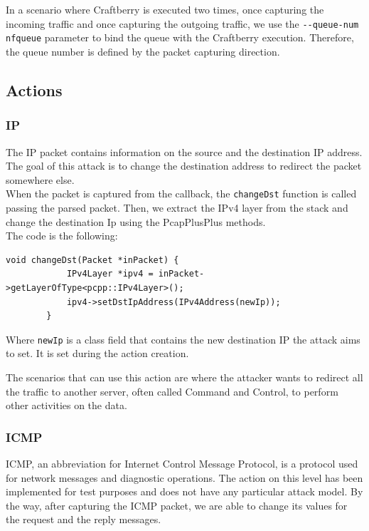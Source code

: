 \documentclass[12pt]{article}
\begin{document}
	In a scenario where Craftberry is executed two times, once capturing the incoming traffic and once capturing the outgoing traffic, we use the \lstinline{--queue-num nfqueue} parameter to bind the queue with the Craftberry execution. Therefore, the queue number is defined by the packet capturing direction.

	\subsection{Actions}

	\subsubsection{IP}
	The IP packet contains information on the source and the destination IP address. The goal of this attack is to change the destination address to redirect the packet somewhere else.\\
	When the packet is captured from the callback, the \lstinline{changeDst} function is called passing the parsed packet. Then, we extract the IPv4 layer from the stack and change the destination Ip using the PcapPlusPlus methods.\\
	The code is the following:
	\bigbreak

	\begin{lstlisting}[frame=single]
		void changeDst(Packet *inPacket) {
			IPv4Layer *ipv4 = inPacket->getLayerOfType<pcpp::IPv4Layer>();
			ipv4->setDstIpAddress(IPv4Address(newIp));
		}
	\end{lstlisting}
	\bigbreak

	Where \lstinline{newIp} is a class field that contains the new destination IP the attack aims to set. It is set during the action creation.

	\bigbreak
	The scenarios that can use this action are where the attacker wants to redirect all the traffic to another server, often called Command and Control, to perform other activities on the data.   
	
	\subsubsection{ICMP}
	ICMP, an abbreviation for Internet Control Message Protocol, is a protocol used for network messages and diagnostic operations. The action on this level has been implemented for test purposes and does not have any particular attack model. By the way, after capturing the ICMP packet, we are able to change its values for the request and the reply messages.
\end{document}
